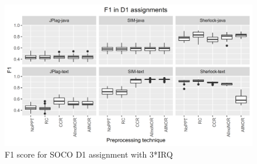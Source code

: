 \documentclass[a4paper, 12pt, oneside, openany, final, pdftex]{book}\usepackage[]{graphicx}\usepackage[]{color}
\makeatletter
\def\maxwidth{ %
  \ifdim\Gin@nat@width>\linewidth
    \linewidth
  \else
    \Gin@nat@width
  \fi
}
\newenvironment{knitrout}{}{} %
\makeatother
\begin{document}
\begin{figure}
	\centering 
\begin{knitrout}
\color{fgcolor}
\includegraphics[width=\maxwidth]{figure/FigureBoxPlotD13IRQ-1} 

\end{knitrout}
	\caption{F1 score for SOCO D1 assignment with 3*IRQ}\label{fig:FigureBoxPlotD13IRQ}
\end{figure}
\end{document}

